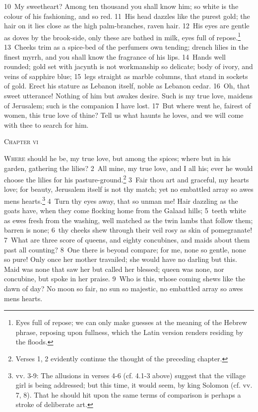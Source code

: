 \documentclass[10pt]{book} %
\begin{document}
\textcolor{benred8}{10}~My sweetheart? Among ten thousand you shall know him; so white is the colour of his fashioning, and so red. \textcolor{benred8}{11}~His head dazzles like the purest gold; the hair on it lies close as the high palm-branches, raven hair. \textcolor{benred8}{12}~His eyes are gentle as doves by the brook-side, only these are bathed in milk, eyes full of repose.\footnote[3]{\textasciigrave Eyes full of repose\textquotesingle ; we can only make guesses at the meaning of the Hebrew phrase, \textasciigrave reposing upon fullness\textquotesingle , which the Latin version renders \textasciigrave residing by the floods\textquotesingle .} \textcolor{benred8}{13}~Cheeks trim as a spice-bed of the perfumer\textquotesingle s own tending; drench lilies in the finest myrrh, and you shall know the fragrance of his lips. \textcolor{benred8}{14}~Hands well rounded; gold set with jacynth is not workmanship so delicate; body of ivory, and veins of sapphire blue; \textcolor{benred8}{15}~legs straight as marble columns, that stand in sockets of gold. Erect his stature as Lebanon itself, noble as Lebanon cedar. \textcolor{benred8}{16}~Oh, that sweet utterance! Nothing of him but awakes desire. Such is my true love, maidens of Jerusalem; such is the companion I have lost.
\textcolor{benred8}{17}~But where went he, fairest of women, this true love of thine? Tell us what haunts he loves, and we will come with thee to search for him.
\begin{large}\begin{center}\textsc{Chapter vi}\end{center}\end{large}
\lettrine[lines=2]{W}{here} should he be, my true love, but among the spices; where but in his garden, gathering the lilies? \textcolor{benred8}{2}~All mine, my true love, and I all his; ever he would choose the lilies for his pasture-ground.\footnote[1]{Verses 1, 2 evidently continue the thought of the preceding chapter.}
\textcolor{benred8}{3}~Fair thou art and graceful, my heart\textquotesingle s love; for beauty, Jerusalem itself is not thy match; yet no embattled array so awes men\textquotesingle s hearts.\footnote[2]{vv. 3-9: The allusions in verses 4-6 (cf. 4.1-3 above) suggest that the village girl is being addressed; but this time, it would seem, by king Solomon (cf. vv. 7, 8). That he should hit upon the same terms of comparison is perhaps a stroke of deliberate art.} \textcolor{benred8}{4}~Turn thy eyes away, that so unman me! Hair dazzling as the goats have, when they come flocking home from the Galaad hills; \textcolor{benred8}{5}~teeth white as ewes fresh from the washing, well matched as the twin lambs that follow them; barren is none; \textcolor{benred8}{6}~thy cheeks shew through their veil rosy as skin of pomegranate! \textcolor{benred8}{7}~What are three score of queens, and eighty concubines, and maids about them past all counting? \textcolor{benred8}{8}~One there is beyond compare; for me, none so gentle, none so pure! Only once her mother travailed; she would have no darling but this. Maid was none that saw her but called her blessed; queen was none, nor concubine, but spoke in her praise. \textcolor{benred8}{9}~Who is this, whose coming shews like the dawn of day? No moon so fair, no sun so majestic, no embattled array so awes men\textquotesingle s hearts.
\end{document}
